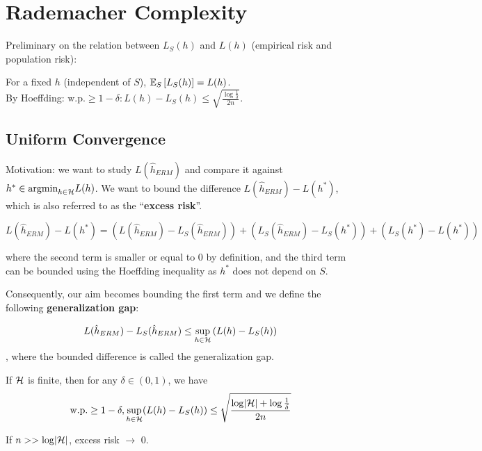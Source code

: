
\chapter{Rademacher Complexity}

Preliminary on the relation between \(L_S(h)\) and \(L(h)\) (empirical risk and population risk):

For a fixed \(h\) (independent of \(S\)), \(\mathbb{E}_S \left[ L_S(h) \right] = L(h)\). \\ 
By Hoeffding: \(\text{w.p.} \geq 1 - \delta \colon L(h) - L_S(h) \leq \sqrt{\frac{\log \frac{1}{\delta}}{2n}}\). 


\section{Uniform Convergence}

Motivation: we want to study \(L(\hat{h}_{ERM})\) and compare it against 
\(h^* \in \text{argmin}_{h \in \mathcal{H}} L(h)\). We want to bound the 
difference \(L(\hat{h}_{ERM}) - L(h^*)\), which is also referred to as the ``\textbf{excess risk}''. 


\[
  L(\hat{h}_{ERM}) - L(h^*) = \left(L(\hat{h}_{ERM}) - L_S(\hat{h}_{ERM})\right) + 
  \left( L_S(\hat{h}_{ERM}) - L_S(h^*) \right) + \left(L_S(h^*) - L(h^*)\right) 
\]

where the second term is smaller or equal to 0 by definition, and the third term can be bounded 
using the Hoeffding inequality as \(h^*\) does not depend on \(S\). 

Consequently, our aim becomes bounding the first term and we define the following 
\textbf{generalization gap}: 

\begin{definition}
    \[L(\hat{h}_{ERM}) - L_S (\hat{h}_{ERM}) \leq \sup_{h \in \mathcal{H}} \left(L(h) - L_S(h)\right)\], 
    where the bounded difference is called the generalization gap. 
\end{definition}

\begin{theorem}
    If \(\mathcal{H}\) is finite, then for any \(\delta \in (0, 1)\), we have 
    \[
        \text{w.p.} \geq 1 - \delta, \sup_{h \in \mathcal{H}} (L(h) - L_S(h)) \leq \sqrt{\frac{\log \lvert \mathcal{H} \rvert + \log \frac{1}{\delta}}{2n}}  
    \]
\end{theorem}


\begin{remark}
    If \(n >> \log \lvert \mathcal{H} \rvert\), excess risk \(\to\) 0. 
\end{remark}

